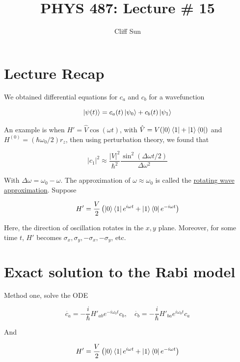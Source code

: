 \documentclass{article}
\title{PHYS 487: Lecture \# 15}
\author{Cliff Sun}
\newtheorem{one minute paper}[theorem]{One Minute Paper}
\begin{document}
\maketitle

\section*{Lecture Recap}
We obtained differential equations for $c_a$ and $c_b$ for a wavefunction 

\begin{equation}
    \ket{\psi(t)} = c_a(t)\ket{\psi_0} + c_b(t)\ket{\psi_1}
\end{equation}

An example is when $H' = \hat{V}\cos\left( \omega t \right)$, with $\hat{V} = V(\ket{0}\bra{1} + \ket{1}\bra{0})$ and $H^{(0)} = (\hbar\omega_0/2) r_z$, then using perturbation theory, we 
found that 

\begin{equation}
    |c_1|^2 \approx \frac{|V|^2}{\hbar^2}\frac{\sin^2(\Delta \omega t/2)}{\Delta \omega^2}
\end{equation}

With $\Delta \omega = \omega_0 - \omega$. The approximation of $\omega \approx \omega_0$ is called the \underline{rotating wave approximation}. Suppose 

\begin{equation}
    H' = \frac{V}{2}\left( \ket{0}\bra{1}e^{i\omega t} + \ket{1}\bra{0}e^{-i \omega t}\right)
\end{equation}

Here, the direction of oscillation rotates in the $x,y$ plane. 
Moreover, for some time $t$, $H'$ becomes 
$\sigma_x, \sigma_y, -\sigma_x, -\sigma_y$, etc. 

\section*{Exact solution to the Rabi model}

Method one, solve the ODE 

\begin{equation}
    \dot{c_a} = -\frac{i}{\hbar}H'_{ab}e^{-i\omega_0 t}c_b, \quad \dot{c_b} = -\frac{i}{\hbar}H'_{ba}e^{i\omega_0 t}c_a
\end{equation}

And 

\begin{equation}
    H' = \frac{V}{2}\left( \ket{0}\bra{1}e^{i\omega t} + \ket{1}\bra{0}e^{-i\omega t} \right)
\end{equation}
\end{document}
